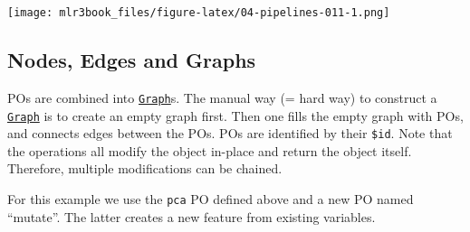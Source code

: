 \documentclass[]{article}
\newenvironment{Shaded}{\begin{snugshade}}{\end{snugshade}}
\newcommand{\CommentTok}[1]{\textcolor[rgb]{0.56,0.35,0.01}{\textit{#1}}}
\newcommand{\DataTypeTok}[1]{\textcolor[rgb]{0.13,0.29,0.53}{#1}}
\newcommand{\KeywordTok}[1]{\textcolor[rgb]{0.13,0.29,0.53}{\textbf{#1}}}
\newcommand{\NormalTok}[1]{#1}
\newcommand{\OperatorTok}[1]{\textcolor[rgb]{0.81,0.36,0.00}{\textbf{#1}}}
\newcommand{\OtherTok}[1]{\textcolor[rgb]{0.56,0.35,0.01}{#1}}
\newcommand{\StringTok}[1]{\textcolor[rgb]{0.31,0.60,0.02}{#1}}
\renewenvironment{Shaded} {\begin{snugshade}\small} {\end{snugshade}}
\begin{document}
\begin{Shaded}
\end{Shaded}

\texttt{[image: mlr3book\_files/figure-latex/04-pipelines-011-1.png]}

\hypertarget{pipe-nodes-edges-graphs}{%
\subsection{Nodes, Edges and Graphs}\label{pipe-nodes-edges-graphs}}

POs are combined into \href{https://mlr3pipelines.mlr-org.com/reference/Graph.html}{\texttt{Graph}}s.
The manual way (= hard way) to construct a \href{https://mlr3pipelines.mlr-org.com/reference/Graph.html}{\texttt{Graph}} is to create an empty graph first.
Then one fills the empty graph with POs, and connects edges between the POs.
POs are identified by their \texttt{\$id}.
Note that the operations all modify the object in-place and return the object itself.
Therefore, multiple modifications can be chained.

For this example we use the \texttt{pca} PO defined above and a new PO named ``mutate''.
The latter creates a new feature from existing variables.

\begin{Shaded}
\end{Shaded}

\begin{Shaded}
\end{Shaded}
\end{document}
